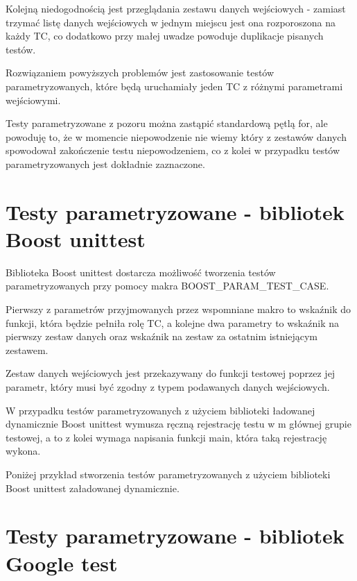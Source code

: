 \documentclass[12pt,a4paper,notitlepage]{report}
\begin{document}
Kolejną niedogodnością jest przeglądania zestawu danych wejściowych - zamiast trzymać listę danych wejściowych w jednym miejscu jest ona rozporoszona na każdy TC, co dodatkowo przy małej uwadze powoduje duplikacje pisanych testów.

Rozwiązaniem powyższych problemów jest zastosowanie testów parametryzowanych, które będą uruchamiały jeden TC z różnymi parametrami wejściowymi. 

Testy parametryzowane z pozoru można zastąpić standardową pętlą for, ale powoduję to, że w momencie niepowodzenie nie wiemy który z zestawów danych spowodował zakończenie testu niepowodzeniem, co z kolei w przypadku testów parametryzowanych jest dokładnie zaznaczone.

\section{Testy parametryzowane - bibliotek Boost unittest}

Biblioteka Boost unittest dostarcza możliwość tworzenia testów parametryzowanych przy pomocy makra BOOST{\_}PARAM{\_}TEST{\_}CASE.

Pierwszy z parametrów przyjmowanych przez wspomniane makro to wskaźnik do funkcji, która będzie pełniła rolę TC, a kolejne dwa parametry to wskaźnik na pierwszy zestaw danych oraz wskaźnik na zestaw za ostatnim istniejącym zestawem.

Zestaw danych wejściowych jest przekazywany do funkcji testowej poprzez jej parametr, który musi być zgodny z typem podawanych danych wejściowych.

W przypadku testów parametryzowanych z użyciem biblioteki ładowanej dynamicznie Boost unittest wymusza ręczną rejestrację testu w m głównej grupie testowej, a to z kolei wymaga napisania funkcji main, która taką rejestrację wykona.

Poniżej przykład stworzenia testów parametryzowanych z użyciem biblioteki Boost unittest załadowanej dynamicznie.

			

\section{Testy parametryzowane - bibliotek Google test}
\end{document}
